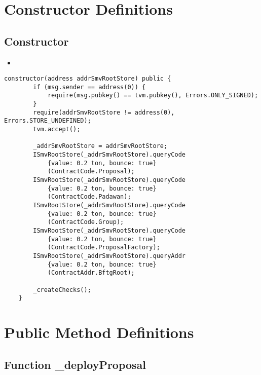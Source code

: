 \section{Constructor Definitions}


\subsection{Constructor}

\begin{itemize}
\item {}
\end{itemize}

\begin{lstlisting}[firstnumber=64]
    constructor(address addrSmvRootStore) public {
        if (msg.sender == address(0)) {
            require(msg.pubkey() == tvm.pubkey(), Errors.ONLY_SIGNED);
        }
        require(addrSmvRootStore != address(0), Errors.STORE_UNDEFINED);
        tvm.accept();
        
        _addrSmvRootStore = addrSmvRootStore;
        ISmvRootStore(_addrSmvRootStore).queryCode
            {value: 0.2 ton, bounce: true}
            (ContractCode.Proposal);
        ISmvRootStore(_addrSmvRootStore).queryCode
            {value: 0.2 ton, bounce: true}
            (ContractCode.Padawan);
        ISmvRootStore(_addrSmvRootStore).queryCode
            {value: 0.2 ton, bounce: true}
            (ContractCode.Group);
        ISmvRootStore(_addrSmvRootStore).queryCode
            {value: 0.2 ton, bounce: true}
            (ContractCode.ProposalFactory);
        ISmvRootStore(_addrSmvRootStore).queryAddr
            {value: 0.2 ton, bounce: true}
            (ContractAddr.BftgRoot);

        _createChecks();
    }
\end{lstlisting}

\section{Public Method Definitions}


\subsection{Function \_{}deployProposal}

